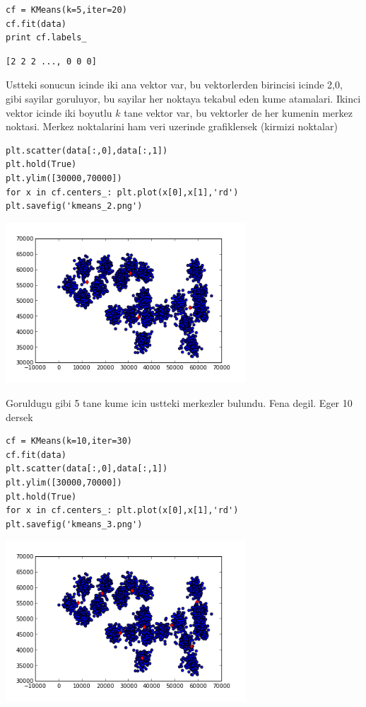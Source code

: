 \documentclass[12pt,fleqn]{article}\usepackage{../common}
\begin{document}
\begin{verbatim}
cf = KMeans(k=5,iter=20)
cf.fit(data)
print cf.labels_
\end{verbatim}

\begin{verbatim}
[2 2 2 ..., 0 0 0]
\end{verbatim}

Ustteki sonucun icinde iki ana vektor var, bu vektorlerden birincisi icinde
2,0, gibi sayilar goruluyor, bu sayilar her noktaya tekabul eden kume
atamalari.  Ikinci vektor icinde iki boyutlu $k$ tane vektor var, bu
vektorler de her kumenin merkez noktasi. Merkez noktalarini ham veri
uzerinde grafiklersek (kirmizi noktalar)

\begin{verbatim}
plt.scatter(data[:,0],data[:,1])
plt.hold(True)
plt.ylim([30000,70000])
for x in cf.centers_: plt.plot(x[0],x[1],'rd')
plt.savefig('kmeans_2.png')
\end{verbatim}

\includegraphics[height=6cm]{kmeans_2.png}

Goruldugu gibi 5 tane kume icin ustteki merkezler bulundu. Fena
degil. Eger 10 dersek

\begin{verbatim}
cf = KMeans(k=10,iter=30)
cf.fit(data)
plt.scatter(data[:,0],data[:,1])
plt.ylim([30000,70000])
plt.hold(True)
for x in cf.centers_: plt.plot(x[0],x[1],'rd')
plt.savefig('kmeans_3.png')
\end{verbatim}

\includegraphics[height=6cm]{kmeans_3.png}
\end{document}
